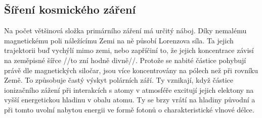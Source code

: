 \documentclass[11pt,a4paper]{article}
\begin{document}
\subsection*{Šíření kosmického záření}
Na počet většinová složka primárního záření má určitý náboj. Díky nemalému
magnetickému poli náležícímu Zemi na ně působí Lorenzova síla. Ta jejich
trajektorii buď vychýlí mimo zemi, nebo zapříčiní to, že jejich koncentrace
závisí na zeměpisné šířce //to zní hodně divně//. Protože se nabité částice pohybují právě dle
magnetických siločar, jsou více koncentrovány na pólech než při rovníku
Země. To způsobuje častý výskyt polárních září. Ty vznikají, když částice
ionizačního zážení při interakcích s atomy v atmosféře excitují jejich
elektony na vyšší energetickou hladinu v obalu atomu. Ty se brzy vrátí na
hladiny původní a při tomto uvolní nabytou energii ve formě fotonů o
charakteristické vlnové délce.\par
%
%
\end{document}
